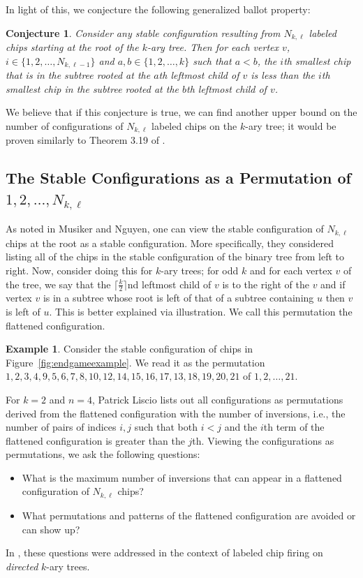 \documentclass[11pt]{article}
\newtheorem{conjecture}[theorem]{Conjecture}
\theoremstyle{remark}
\theoremstyle{definition}
\newtheorem{example}[theorem]{Example}
\begin{document}
In light of this, we conjecture the following generalized ballot property:
\begin{conjecture}
    Consider any stable configuration resulting from $N_{k, \ell}$ labeled chips starting at the root of the $k$-ary tree. Then for each vertex $v$, $i\in \{1,2, \dots, N_{k, \ell-1}\}$ and $a, b \in \{1,2, \dots, k\}$ such that $a < b$, the $i$th smallest chip that is in the subtree rooted at the $a$th leftmost child of $v$ is less than the $i$th smallest chip in the subtree rooted at the $b$th leftmost child of $v$.
\end{conjecture}

We believe that if this conjecture is true, we can find another upper bound on the number of configurations of $N_{k, \ell}$ labeled chips on the $k$-ary tree; it would be proven similarly to Theorem 3.19 of \cite{inagaki2024chipfiringundirectedbinarytrees}.

\subsection{The Stable Configurations as a Permutation of $1, 2, \dots, N_{k, \ell}$}
As noted in Musiker and Nguyen, one can view the stable configuration of $N_{k, \ell}$ chips at the root as a stable configuration. More specifically, they considered listing all of the chips in the stable configuration of the binary tree from left to right.  Now, consider doing this for $k$-ary trees; for odd $k$ and for each vertex $v$ of the tree, we say that the $\lceil \frac{k}{2}\rceil$nd leftmost child of $v$ is to the right of the $v$ and if vertex $v$ is in a subtree whose root is left of that of a subtree containing $u$ then $v$ is left of $u$. This is better explained via illustration. We call this permutation the flattened configuration.

\begin{example}
    Consider the stable configuration of chips in Figure~\ref{fig:endgameexample}. We read it as the permutation $1,2, 3, 4, 9, 5, 6, 7, 8, 10, 12, 14, 15, 16, 17, 13, 18, 19, 20, 21$ of $1,2, \dots, 21.$
\end{example}

For $k=2$ and $n=4$, Patrick Liscio \cite{liscio} lists out all configurations as permutations derived from the flattened configuration with the number of inversions, i.e., the number of pairs of indices $i, j$ such that both $i < j$ and the $i$th term of the flattened configuration is greater than the $j$th. Viewing the configurations as permutations, we ask the following questions:
\begin{itemize}
    \item What is the maximum number of inversions that can appear in a flattened configuration of $N_{k, \ell}$ chips?
    \item What permutations and patterns of the flattened configuration are avoided or can show up?
\end{itemize}
In \cite{MR4887467}, these questions were addressed in the context of labeled chip firing on \emph{directed} $k$-ary trees. 
\end{document}
